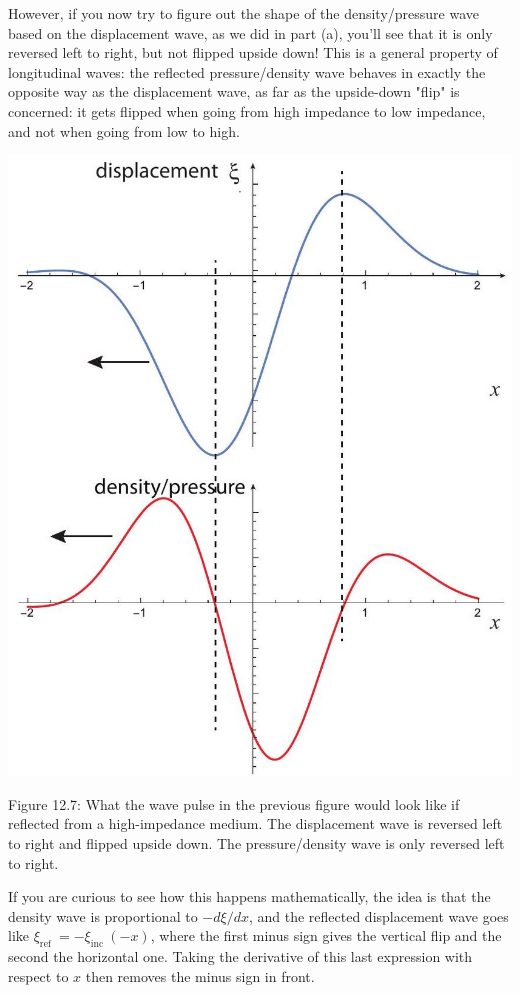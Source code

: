 \documentclass[10pt]{article}
\begin{document}
However, if you now try to figure out the shape of the density/pressure wave based on the displacement wave, as we did in part (a), you'll see that it is only reversed left to right, but not flipped upside down! This is a general property of longitudinal waves: the reflected pressure/density wave behaves in exactly the opposite way as the displacement wave, as far as the upside-down "flip" is concerned: it gets flipped when going from high impedance to low impedance, and not when going from low to high.

\begin{center}
\includegraphics[max width=\textwidth]{2024_09_14_9969b06773f10b6936e8g-315}
\end{center}

Figure 12.7: What the wave pulse in the previous figure would look like if reflected from a high-impedance medium. The displacement wave is reversed left to right and flipped upside down. The pressure/density wave is only reversed left to right.

If you are curious to see how this happens mathematically, the idea is that the density wave is proportional to $-d \xi / d x$, and the reflected displacement wave goes like $\xi_{\text {ref }}=-\xi_{\text {inc }}(-x)$, where the first minus sign gives the vertical flip and the second the horizontal one. Taking the derivative of this last expression with respect to $x$ then removes the minus sign in front.
\end{document}
